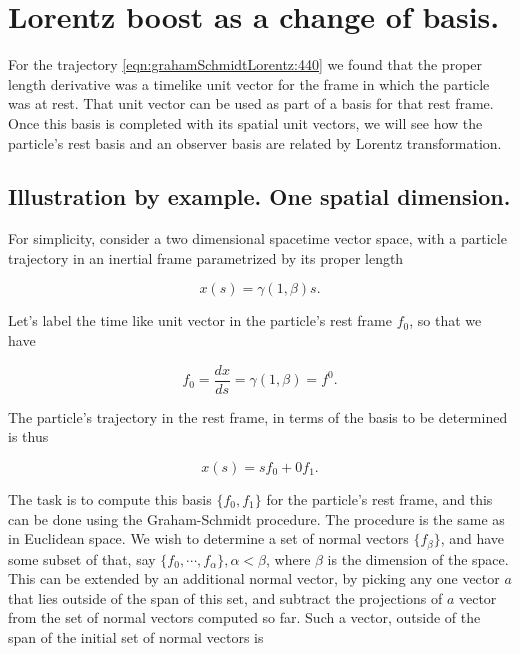 \section{Lorentz boost as a change of basis.}

For the trajectory \ref{eqn:grahamSchmidtLorentz:440} we found that the proper length derivative was a timelike unit vector for the frame in which the particle was at rest.  That unit vector can be used as part of a basis for that rest frame.  Once this basis is completed with its spatial unit vectors, we will see how the particle's rest basis and an observer basis are related by Lorentz transformation.

\subsection{Illustration by example.  One spatial dimension.}

For simplicity, consider a two dimensional spacetime vector space, with a particle trajectory in an inertial frame parametrized by its proper length

\begin{equation}\label{eqn:grahamSchmidtLorentz:600}
x(s) = \gamma (1, \beta) s.
\end{equation}

Let's label the time like unit vector in the particle's rest frame $f_0$, so that we have

\begin{equation}\label{eqn:grahamSchmidtLorentz:620}
f_0 = \frac{dx}{ds} = \gamma (1, \beta) = f^0.
\end{equation}

The particle's trajectory in the rest frame, in terms of the basis to be determined is thus

\begin{equation}\label{eqn:grahamSchmidtLorentz:640}
x(s) = s f_0 + 0 f_1.
\end{equation}

The task is to compute this basis $\{f_0, f_1\}$ for the particle's rest frame, and this can be done using the Graham-Schmidt procedure.  The procedure is the same as in Euclidean space.  We wish to determine a set of normal vectors $\{f_\beta\}$, and have some subset of that, say $\{f_0, \cdots, f_\alpha\}, \alpha < \beta$, where $\beta$ is the dimension of the space.  This can be extended by an additional normal vector, by picking any one vector $a$ that lies outside of the span of this set, and subtract the projections of $a$ vector from the set of normal vectors computed so far.  Such a vector, outside of the span of the initial set of normal vectors is

